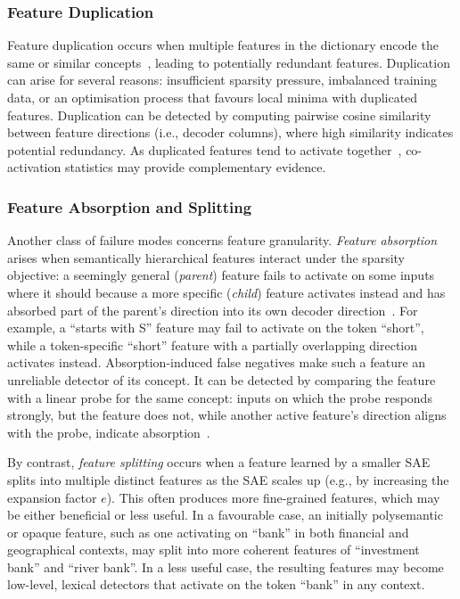 \subsubsection{Feature Duplication}
Feature duplication occurs when multiple features in the dictionary encode the same or similar concepts~, leading to potentially redundant features. Duplication can arise for several reasons: insufficient sparsity pressure, imbalanced training data, or an optimisation process that favours local minima with duplicated features. Duplication can be detected by computing pairwise cosine similarity between feature directions (i.e., decoder columns), where high similarity indicates potential redundancy. As duplicated features tend to activate together~, co-activation statistics may provide complementary evidence. 

\subsubsection{Feature Absorption and Splitting}

Another class of failure modes concerns feature granularity. \emph{Feature absorption} arises when semantically hierarchical features interact under the sparsity objective: a seemingly general (\emph{parent}) feature fails to activate on some inputs where it should because a more specific (\emph{child}) feature activates instead and has absorbed part of the parent's direction into its own decoder direction~. For example, a ``starts with S'' feature may fail to activate on the token ``short'', while a token-specific ``short'' feature with a partially overlapping direction activates instead. Absorption-induced false negatives make such a feature an unreliable detector of its concept. It can be detected by comparing the feature with a linear probe for the same concept: inputs on which the probe responds strongly, but the feature does not, while another active feature's direction aligns with the probe, indicate absorption~.

By contrast, \emph{feature splitting} occurs when a feature learned by a smaller SAE splits into multiple distinct features as the SAE scales up (e.g., by increasing the expansion factor \(e\)). This often produces more fine-grained features, which may be either beneficial or less useful. In a favourable case, an initially polysemantic or opaque feature, such as one activating on ``bank'' in both financial and geographical contexts, may split into more coherent features of ``investment bank'' and ``river bank''. In a less useful case, the resulting features may become low-level, lexical detectors that activate on the token ``bank'' in any context.

